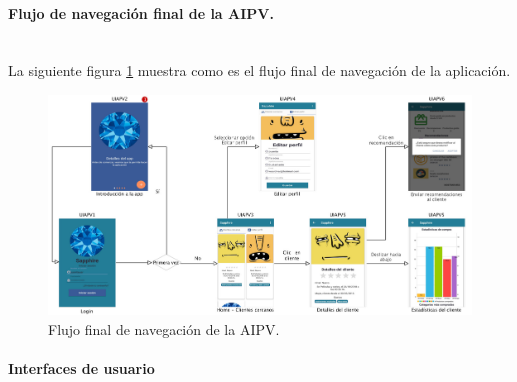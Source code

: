 \paragraph{Flujo de navegación final de la AIPV.} ~\\

La siguiente figura \ref{navegacion-AIPVFinal} muestra como es el flujo final de navegación de la aplicación.

\FloatBarrier
\begin{figure}[htbp!]
		\centering
			\includegraphics[width=1 \textwidth]{imagenes/adrian/vendedor/prototipoFinal/UIApp/ui}
		\caption{Flujo final de navegación de la AIPV.}
		\label{navegacion-AIPVFinal}
\end{figure}

\paragraph{Interfaces de usuario}


